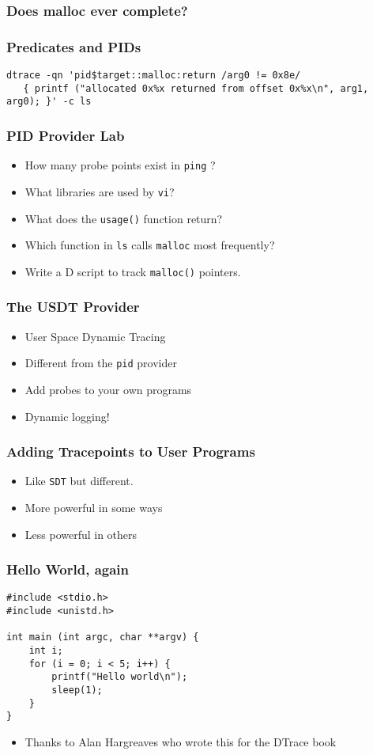 \documentclass[pdftex]{beamer}
\begin{document}
\begin{frame}[fragile]
  \frametitle{Does malloc ever complete?}
\end{frame}

\begin{frame}[fragile]
  \frametitle{Predicates and PIDs}
\begin{lstlisting}
dtrace -qn 'pid$target::malloc:return /arg0 != 0x8e/ 
   { printf ("allocated 0x%x returned from offset 0x%x\n", arg1, arg0); }' -c ls
\end{lstlisting}
\end{frame}

\begin{frame}[fragile]
  \frametitle{PID Provider Lab}
  \begin{itemize}
  \item How many probe points exist in \verb+ping+ ?
  \item What libraries are used by \verb+vi+?
  \item What does the \verb+usage()+ function return?
  \item Which function in \verb+ls+ calls \verb+malloc+ most frequently?
  \item Write a D script to track \verb+malloc()+ pointers.
  \end{itemize}
\end{frame}


\begin{frame}[fragile]
  \frametitle{The USDT Provider}
  \begin{itemize}
  \item User Space Dynamic Tracing
  \item Different from the \verb|pid| provider
  \item Add probes to your own programs
  \item Dynamic logging!
  \end{itemize}
\end{frame}

\begin{frame}[fragile]
  \frametitle{Adding Tracepoints to User Programs}
  \begin{itemize}
  \item Like \verb+SDT+ but different.
  \item More powerful in some ways
  \item Less powerful in others
  \end{itemize}
\end{frame}

\begin{frame}[fragile]
  \frametitle{Hello World, again}
\begin{lstlisting}
#include <stdio.h>
#include <unistd.h>

int main (int argc, char **argv) {
	int i;
	for (i = 0; i < 5; i++) {
		printf("Hello world\n");
		sleep(1);
	}
}  
\end{lstlisting}
  \begin{itemize}
  \item Thanks to Alan Hargreaves who wrote this for the DTrace book
  \end{itemize}
\end{frame}
\end{document}
